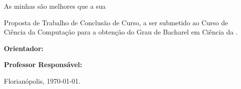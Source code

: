 


\begin{titlepage}

    \center




    \Author



    \bigskip
    As minhas são melhores que a sua\\[3cm]

    \begin{flushright}

        \begin{minipage}{0.518\textwidth}

            Proposta de Trabalho de Conclusão de Curso,
            a ser submetido ao Curso de Ciência da Computação
            para a obtenção do Grau de Bacharel em Ciência da .

            \medskip
            {\bfseries Orientador:} \hfill \Advisor

            \medskip
            {\bfseries Professor Responsável:} \hfill \Supervisor

        \end{minipage}

    \end{flushright}


    Florianópolis, \today.

\end{titlepage}






